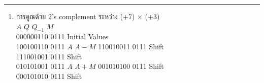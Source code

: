 \documentclass[12pt, a4paper]{article}
\begin{document}
\hrule\vspace{12pt}
\raggedright
\*
\begin{enumerate}
    \item การคูณด้วย 2's complement ระหว่าง (+7) $\times$ (+3)\\ $\mbox{}$ \\ 
    $A$\hspace*{2cm} $Q$ \hspace*{2cm} $Q_{-1}$ \hspace*{2cm} $M$ \hspace*{2cm}  \\  $\mbox{}$ \\ 
    0000\hspace*{2cm}0011\hspace*{2cm}0\hspace*{2cm}         0111 \hspace*{2cm}  Initial Values 
      \\  $\mbox{}$ \\ 
    1001\hspace*{2cm}0011\hspace*{2cm}0\hspace*{2cm}         0111 \hspace*{2cm}  $A$\hspace*{1cm} $A-M$
    1100\hspace*{2cm}1001\hspace*{2cm}1\hspace*{2cm}         0111 \hspace*{2cm}  Shift 
    \\  $\mbox{}$ \\ 
    1110\hspace*{2cm}0100\hspace*{2cm}1\hspace*{2cm}         0111 \hspace*{2cm}  Shift
    \\  $\mbox{}$ \\ 
    0101\hspace*{2cm}0100\hspace*{2cm}1\hspace*{2cm}         0111 \hspace*{2cm}  $A$\hspace*{1cm} $A+M$
    0010\hspace*{2cm}1010\hspace*{2cm}0\hspace*{2cm}         0111 \hspace*{2cm}  Shift
    \\  $\mbox{}$ \\ 
    0001\hspace*{2cm}0101\hspace*{2cm}0\hspace*{2cm}         0111 \hspace*{2cm}  Shift
    \\  $\mbox{}$ \\ 
    

\end{enumerate}
\end{document}
